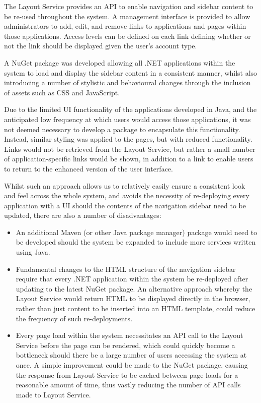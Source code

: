 The Layout Service provides an API to enable navigation and sidebar content to be re-used throughout the system. A management interface is provided to allow administrators to add, edit, and remove links to applications and pages within those applications. Access levels can be defined on each link defining whether or not the link should be displayed given the user's account type.

A NuGet package was developed allowing all .NET applications within the system to load and display the sidebar content in a consistent manner, whilst also introducing a number of stylistic and behavioural changes through the inclusion of assets such as CSS and JavaScript.

Due to the limited UI functionality of the applications developed in Java, and the anticipated low frequency at which users would access those applications, it was not deemed necessary to develop a package to encapsulate this functionality. Instead, similar styling was applied to the pages, but with reduced functionality. Links would not be retrieved from the Layout Service, but rather a small number of application-specific links would be shown, in addition to a link to enable users to return to the enhanced version of the user interface.

Whilst such an approach allows us to relatively easily ensure a consistent look and feel across the whole system, and avoids the necessity of re-deploying every application with a UI should the contents of the navigation sidebar need to be updated, there are also a number of disadvantages:
\begin{itemize}
    \item An additional Maven (or other Java package manager) package would need to be developed should the system be expanded to include more services written using Java.
    \item Fundamental changes to the HTML structure of the navigation sidebar require that every .NET application within the system be re-deployed after updating to the latest NuGet package. An alternative approach whereby the Layout Service would return HTML to be displayed directly in the browser, rather than just content to be inserted into an HTML template, could reduce the frequency of such re-deployments.
    \item Every page load within the system necessitates an API call to the Layout Service before the page can be rendered, which could quickly become a bottleneck should there be a large number of users accessing the system at once. A simple improvement could be made to the NuGet package, causing the response from Layout Service to be cached between page loads for a reasonable amount of time, thus vastly reducing the number of API calls made to Layout Service.
\end{itemize}
